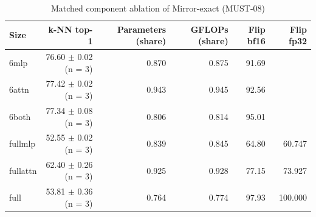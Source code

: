 \begin{table}[t]
\centering
\small
\caption{Matched component ablation of Mirror-exact (MUST-08)}
\label{tab:table3b_components}
\begin{tabular}{lrrrrr}
\toprule
Size & k-NN top-1 & Parameters (share) & GFLOPs (share) & Flip bf16 & Flip fp32 \\
\midrule
6mlp & 76.60 $\pm$ 0.02 (n = 3) & 0.870 & 0.875 & 91.69 &  \\
6attn & 77.42 $\pm$ 0.02 (n = 3) & 0.943 & 0.945 & 92.56 &  \\
6both & 77.34 $\pm$ 0.08 (n = 3) & 0.806 & 0.814 & 95.01 &  \\
fullmlp & 52.55 $\pm$ 0.02 (n = 3) & 0.839 & 0.845 & 64.80 & 60.747 \\
fullattn & 62.40 $\pm$ 0.26 (n = 3) & 0.925 & 0.928 & 77.15 & 73.927 \\
full & 53.81 $\pm$ 0.36 (n = 3) & 0.764 & 0.774 & 97.93 & 100.000 \\
\bottomrule
\end{tabular}
\end{table}
